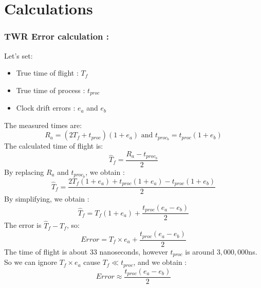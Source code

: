\chapter*{Calculations}

\subsection*{TWR Error calculation : } \label{TWR-Error-calculation}
Let's set: 
\begin{itemize}
\item True time of flight : $T_{f}$
\item True time of process : $t_{proc}$
\item Clock drift errors : $e_a$ and $e_b$
\end{itemize}
The measured times are: 
\begin{equation*}
R_a = (2T_f + t_{proc})(1 + e_a) \text{ and } t_{proc_b} = t_{proc}(1 + e_b)
\end{equation*}
The calculated time of flight is:
\begin{equation*}
\hat{T}_f = \frac{R_a -t_{proc_b}}{2}
\end{equation*}
By replacing $R_a$ and $t_{proc_b}$, we obtain : 
\begin{equation*}
\hat{T}_f = \frac{2T_f(1 + e_a) + t_{proc}(1 + e_a) - t_{proc}(1 + e_b)}{2}
\end{equation*}
By simplifying, we obtain :
\begin{equation*}
\hat{T}_f = T_f(1 + e_a) + \frac{t_{proc}(e_a - e_b)}{2}
\end{equation*}
The error is $\hat{T}_f - T_f$, so: \\
\begin{equation*}
Error = T_f \times e_a + \frac{t_{proc}(e_a - e_b)}{2}
\end{equation*}
The time of flight is about 33 nanoseconds, however $t_{proc}$ is around $3,000,000$ns. \\
So we can ignore $T_f \times e_a$ cause $T_{f} \ll t_{proc}$, and we obtain :
\begin{equation}
Error \approx \frac{t_{proc}(e_a - e_b)}{2} \label{error_TWR}
\end{equation}
\newpage
